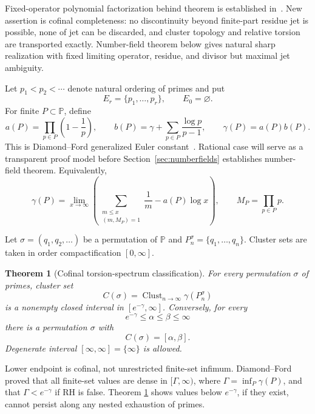 \documentclass[11pt]{article}
\newtheorem{theorem}{Theorem}[section]
\theoremstyle{definition}
\theoremstyle{remark}
\newcommand{\PP}{\mathbb P}
\begin{document}
Fixed-operator polynomial factorization behind theorem is established
in~\cite{HartmannLesch2022}.  New assertion is cofinal completeness: no discontinuity beyond
finite-part residue jet is possible, none of jet can be discarded, and cluster topology and
relative torsion are transported exactly.  Number-field theorem below gives natural sharp
realization with fixed limiting operator, residue, and divisor but maximal jet ambiguity.

Let $p_1<p_2<\cdots$ denote natural ordering of primes and put
\[
 E_r=\{p_1,\ldots,p_r\},\qquad E_0=\varnothing.
\]
For finite $P\subset\PP$, define
\begin{equation}
 a(P)=\prod_{p\in P}\left(1-\frac1p\right),\qquad
 b(P)=\gamma+\sum_{p\in P}\frac{\log p}{p-1},\qquad
 \gamma(P)=a(P)b(P).                                      \tag{1.1}
\end{equation}
This is Diamond--Ford generalized Euler constant~\cite{DiamondFord2008}.  Rational case will
serve as a transparent proof model before Section~\ref{sec:numberfields} establishes number-field
theorem.  Equivalently,
\begin{equation}
 \gamma(P)=\lim_{x\to\infty}
 \left(
 \sum_{\substack{m\leq x\\(m,M_P)=1}}\frac1m-a(P)\log x
 \right),\qquad M_P=\prod_{p\in P}p.                     \tag{1.2}
\end{equation}

Let $\sigma=(q_1,q_2,\ldots)$ be a permutation of $\PP$ and
$P_n^\sigma=\{q_1,\ldots,q_n\}$.  Cluster sets are taken in order compactification
$[0,\infty]$.

\begin{theorem}[Cofinal torsion-spectrum classification]
\label{thm:classification}
For every permutation $\sigma$ of primes, cluster set
\[
 C(\sigma)=\operatorname{Clust}_{n\to\infty}\gamma(P_n^\sigma)
\]
is a nonempty closed interval in $[e^{-\gamma},\infty]$.  Conversely, for every
\[
 e^{-\gamma}\leq\alpha\leq\beta\leq\infty
\]
there is a permutation $\sigma$ with
\begin{equation}
 C(\sigma)=[\alpha,\beta].                                \tag{1.3}
\end{equation}
Degenerate interval $[\infty,\infty]=\{\infty\}$ is allowed.
\end{theorem}

Lower endpoint is cofinal, not unrestricted finite-set infimum.  Diamond--Ford proved that all
finite-set values are dense in $[\Gamma,\infty)$, where
$\Gamma=\inf_P\gamma(P)$, and that $\Gamma<e^{-\gamma}$ if RH is false.  Theorem
\ref{thm:classification} shows values below $e^{-\gamma}$, if they exist, cannot persist along
any nested exhaustion of primes.
\end{document}
